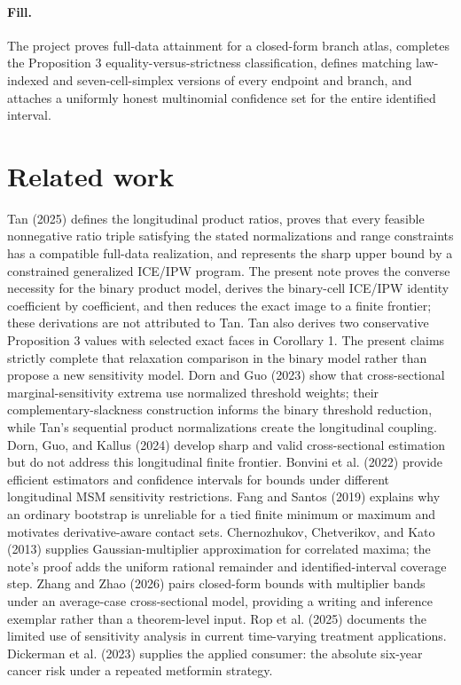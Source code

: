 \documentclass{article}
\begin{document}
\paragraph{Fill.} The project proves full-data attainment for a closed-form branch atlas, completes the Proposition 3 equality-versus-strictness classification, defines matching law-indexed and seven-cell-simplex versions of every endpoint and branch, and attaches a uniformly honest multinomial confidence set for the entire identified interval.

\section{Related work}

Tan (2025) defines the longitudinal product ratios, proves that every feasible nonnegative ratio triple satisfying the stated normalizations and range constraints has a compatible full-data realization, and represents the sharp upper bound by a constrained generalized ICE/IPW program. The present note proves the converse necessity for the binary product model, derives the binary-cell ICE/IPW identity coefficient by coefficient, and then reduces the exact image to a finite frontier; these derivations are not attributed to Tan. Tan also derives two conservative Proposition 3 values with selected exact faces in Corollary 1. The present claims strictly complete that relaxation comparison in the binary model rather than propose a new sensitivity model. Dorn and Guo (2023) show that cross-sectional marginal-sensitivity extrema use normalized threshold weights; their complementary-slackness construction informs the binary threshold reduction, while Tan's sequential product normalizations create the longitudinal coupling. Dorn, Guo, and Kallus (2024) develop sharp and valid cross-sectional estimation but do not address this longitudinal finite frontier. Bonvini et al. (2022) provide efficient estimators and confidence intervals for bounds under different longitudinal MSM sensitivity restrictions. Fang and Santos (2019) explains why an ordinary bootstrap is unreliable for a tied finite minimum or maximum and motivates derivative-aware contact sets. Chernozhukov, Chetverikov, and Kato (2013) supplies Gaussian-multiplier approximation for correlated maxima; the note's proof adds the uniform rational remainder and identified-interval coverage step. Zhang and Zhao (2026) pairs closed-form bounds with multiplier bands under an average-case cross-sectional model, providing a writing and inference exemplar rather than a theorem-level input. Rop et al. (2025) documents the limited use of sensitivity analysis in current time-varying treatment applications. Dickerman et al. (2023) supplies the applied consumer: the absolute six-year cancer risk under a repeated metformin strategy.
\end{document}
